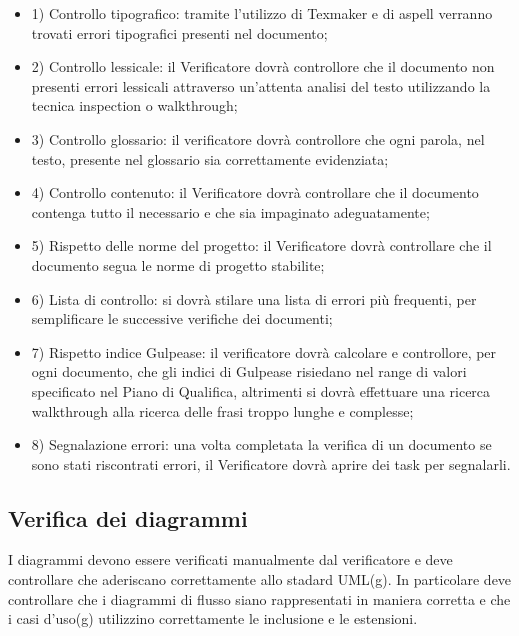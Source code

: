 \begin{itemize}
	\item 1) Controllo tipografico: tramite l'utilizzo di Texmaker e di aspell verranno trovati errori tipografici presenti nel documento;
	\item 2) Controllo lessicale: il Verificatore dovrà controllore che il documento non presenti errori lessicali attraverso un'attenta analisi del testo utilizzando la tecnica inspection o walkthrough;
	\item 3) Controllo glossario: il verificatore dovrà controllore che ogni parola, nel testo, presente nel glossario sia correttamente evidenziata;
	\item 4) Controllo contenuto: il Verificatore dovrà controllare che il documento contenga tutto il necessario e che sia impaginato adeguatamente;
	\item 5) Rispetto delle norme del progetto: il Verificatore dovrà controllare che il documento segua le norme di progetto stabilite;
	\item 6) Lista di controllo: si dovrà stilare una lista di errori più frequenti, per semplificare le successive verifiche dei documenti;
	\item 7) Rispetto indice Gulpease: il verificatore dovrà calcolare e controllore, per ogni documento, che gli indici di Gulpease risiedano nel range di valori specificato nel Piano di Qualifica, altrimenti si dovrà effettuare una ricerca walkthrough alla ricerca delle frasi troppo lunghe e complesse;
	\item 8) Segnalazione errori: una volta completata la verifica di un documento se sono stati riscontrati errori, il Verificatore dovrà aprire dei task per segnalarli.
\end{itemize}

\subsection{Verifica dei diagrammi}

I diagrammi devono essere verificati manualmente dal verificatore e deve controllare che aderiscano correttamente allo stadard UML(g).
In particolare deve controllare che i diagrammi di flusso siano rappresentati in maniera corretta e che i casi d'uso(g) utilizzino correttamente le inclusione e le estensioni.


